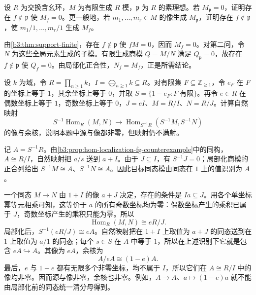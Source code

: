 \begin{exercise}\label{b3:ex:02-zero-neighbourhood}
	设 \(R\) 为交换含幺环，\(M\) 为有限生成 \(R\) 模，\(\mathfrak p\) 为 \(R\) 的素理想。若 \(M_{\mathfrak p}=0\)，证明存在 \(f\notin\mathfrak p\) 使 \(M_f=0\)。更一般地，若 \(m_1,\ldots,m_r\in M\) 的像生成 \(M_{\mathfrak p}\)，证明存在 \(f\notin\mathfrak p\)，使 \(m_1/1,\ldots,m_r/1\) 生成 \(M_f\)。
\end{exercise}
\begin{solution}
	由\cref{b3:thm:support-finite}，存在 \(f\notin\mathfrak p\) 使 \(fM=0\)，因而 \(M_f=0\)。对第二问，令 \(N\) 为这些全局元素生成的子模。有限生成商模 \(Q=M/N\) 满足 \(Q_{\mathfrak p}=0\)，故存在 \(f\notin\mathfrak p\) 使 \(Q_f=0\)。由局部化正合性，\(N_f=M_f\)，正是所需结论。
\end{solution}

\begin{exercise}\label{b3:ex:02-hom-finite-generated-insufficient}
	设 \(k\) 为域，令 \(R=\prod_{n\ge1}k\)，\(I=\bigoplus_{n\ge1}k\subseteq R\)。对有限集 \(F\subseteq\mathbb Z_{\ge1}\)，令 \(e_F\) 在 \(F\) 的坐标上等于 \(1\)，其余坐标上等于 \(0\)，并取 \(S=\{1-e_F:F\;\text{有限}\}\)。再令 \(e\in R\) 在偶数坐标上等于 \(1\)，奇数坐标上等于 \(0\)，\(J=eI\)、\(M=R/I\)、\(N=R/J\)。计算自然映射
	\[
		S^{-1}\operatorname{Hom}_R(M,N)\longrightarrow \operatorname{Hom}_{S^{-1}R}(S^{-1}M,S^{-1}N)
	\]
	的像与余核，说明本题中源与像都非零，但映射仍不满射。
\end{exercise}
\begin{solution}
	记 \(A=S^{-1}R\)。由\cref{b3:prop:hom-localization-fg-counterexample}中的同构，\(A\cong R/I\)，自然映射把 \(a/s\) 送到 \(a+I\)。由于 \(J\subseteq I\)，有 \(S^{-1}J=0\)；局部化商模的正合列给出 \(S^{-1}M\cong A\)、\(S^{-1}N\cong A\)。因此目标同态模由同态在 \(1\) 上的值识别为 \(A\)。

	一个同态 \(M\to N\) 由 \(1+I\) 的像 \(a+J\) 决定，存在的条件是 \(Ia\subseteq J\)。用各个单坐标幂等元相乘可知，这等价于 \(a\) 的所有奇数坐标均为零：偶数坐标产生的乘积已属于 \(J\)，奇数坐标产生的乘积只能为零。所以
	\[
		\operatorname{Hom}_R(M,N)\cong eR/J.
	\]
	局部化后，\(S^{-1}(eR/J)\cong eA\)。自然映射把在 \(1+I\) 上取值为 \(a+J\) 的同态送到在 \(1\) 上取值为 \(a/1\) 的同态；每个 \(s\in S\) 在 \(A\) 中等于 \(1\)，所以在上述识别下它就是包含 \(eA\hookrightarrow A\)。其像为 \(eA\)，余核为
	\[
		A/eA\cong(1-e)A.
	\]
	最后，\(e\) 与 \(1-e\) 都有无限多个非零坐标，均不属于 \(I\)，所以它们在 \(A\cong R/I\) 中的像均非零。因而源与像非零，余核也非零。例如，\(A\to A\)、\(a\mapsto(1-e)a\) 就不能由局部化前的同态统一清分母得到。
\end{solution}

